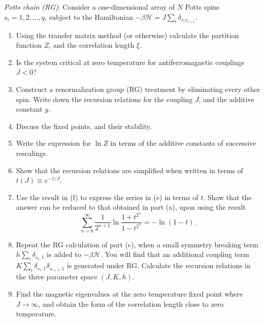 \begin{problem}
    \textit{Potts chain (RG)}: Consider a one-dimensional array of $N$ Potts spins $s_i = 1, 2, \ldots, q$, subject to the Hamiltonian $-\beta\mathcal{H} = J\sum_i\delta_{s_i s_{i+1}}$.

    \begin{enumerate}
        \item[(a)] Using the transfer matrix method (or otherwise) calculate the partition function $Z$, and the correlation length $\xi$.

        \item[(b)] Is the system critical at zero temperature for antiferromagnetic couplings $J < 0$?

        \item[(c)] Construct a renormalization group (RG) treatment by eliminating every other spin. Write down the recursion relations for the coupling $J$, and the additive constant $g$.

        \item[(d)] Discuss the fixed points, and their stability.

        \item[(e)] Write the expression for $\ln Z$ in terms of the additive constants of successive rescalings.

        \item[(f)] Show that the recursion relations are simplified when written in terms of $t(J) \equiv e^{-1/J}$.

        \item[(g)] Use the result in (f) to express the series in (e) in terms of $t$. Show that the answer can be reduced to that obtained in part (a), upon using the result
        \[
            \sum_{n=0}^{\infty}\frac{1}{2^{n+1}}\ln\frac{1+t^{2^n}}{1-t^{2^n}} = -\ln(1-t).
        \]

        \item[(h)] Repeat the RG calculation of part (c), when a small symmetry breaking term $h\sum_i\delta_{s_i, 1}$ is added to $-\beta\mathcal{H}$. You will find that an additional coupling term $K\sum_i\delta_{s_i, 1}\delta_{s_{i+1}, 1}$ is generated under RG. Calculate the recursion relations in the three parameter space $(J, K, h)$.

        \item[(i)] Find the magnetic eigenvalues at the zero temperature fixed point where $J \to \infty$, and obtain the form of the correlation length close to zero temperature.
    \end{enumerate}
\end{problem}

